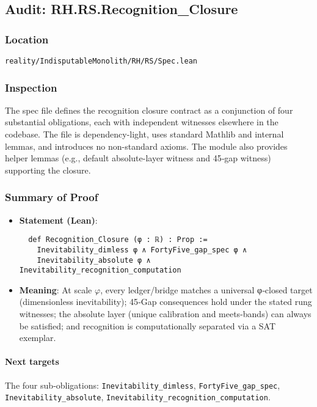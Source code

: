 \documentclass{article}
\newcommand{\FileRef}[1]{\texttt{#1}}
\begin{document}
\subsection{Audit: RH.RS.Recognition\_Closure}
\subsubsection{Location}
\FileRef{reality/IndisputableMonolith/RH/RS/Spec.lean}

\subsubsection{Inspection}
The spec file defines the recognition closure contract as a conjunction of four substantial obligations, each with independent witnesses elsewhere in the codebase. The file is dependency-light, uses standard Mathlib and internal lemmas, and introduces no non-standard axioms. The module also provides helper lemmas (e.g., default absolute-layer witness and 45‑gap witness) supporting the closure.

\subsubsection{Summary of Proof}
\begin{itemize}[leftmargin=*]
  \item \textbf{Statement (Lean)}:
  \begin{lstlisting}
  def Recognition_Closure (φ : ℝ) : Prop :=
    Inevitability_dimless φ ∧ FortyFive_gap_spec φ ∧
    Inevitability_absolute φ ∧ Inevitability_recognition_computation
  \end{lstlisting}
  \item \textbf{Meaning}: At scale \(\varphi\), every ledger/bridge matches a universal φ‑closed target (dimensionless inevitability); 45‑Gap consequences hold under the stated rung witnesses; the absolute layer (unique calibration and meets-bands) can always be satisfied; and recognition is computationally separated via a SAT exemplar.
\end{itemize}

\paragraph{Next targets} The four sub‑obligations: \texttt{Inevitability\_dimless}, \texttt{FortyFive\_gap\_spec}, \texttt{Inevitability\_absolute}, \texttt{Inevitability\_recognition\_computation}.
\end{document}
